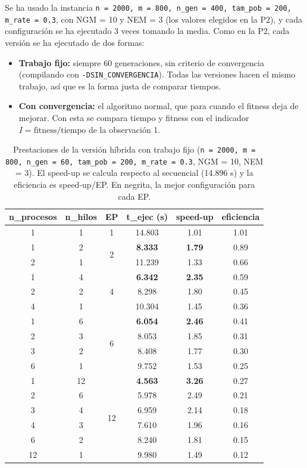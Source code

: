 \documentclass[12pt]{article}
\begin{document}
\begin{enumerate}
Se ha usado la instancia \texttt{n = 2000, m = 800, n\_gen = 400, tam\_pob = 200, m\_rate = 0.3}, con NGM = 10 y NEM = 3 (los valores elegidos en la P2), y cada configuración se ha ejecutado 3 veces tomando la media. Como en la P2, cada versión se ha ejecutado de dos formas:

\begin{itemize}
    \item \textbf{Trabajo fijo:} siempre 60 generaciones, sin criterio de convergencia (compilando con \texttt{-DSIN\_CONVERGENCIA}). Todas las versiones hacen el mismo trabajo, así que es la forma justa de comparar tiempos.
    \item \textbf{Con convergencia:} el algoritmo normal, que para cuando el fitness deja de mejorar. Con esta se compara tiempo y fitness con el indicador $I = \text{fitness}/\text{tiempo}$ de la observación 1.
\end{itemize}

\begin{table}[htbp]
\centering
\begin{tabular}{ccc|ccc}
\toprule
\textbf{n\_procesos} & \textbf{n\_hilos} & \textbf{EP} & \textbf{t\_ejec (s)} & \textbf{speed-up} & \textbf{eficiencia} \\
\midrule
1 & 1 & 1 & 14.803 & 1.01 & 1.01 \\
\midrule
1 & 2 & \multirow{2}{*}{2} & \textbf{8.333} & \textbf{1.79} & 0.89 \\
2 & 1 & & 11.239 & 1.33 & 0.66 \\
\midrule
1 & 4 & \multirow{3}{*}{4} & \textbf{6.342} & \textbf{2.35} & 0.59 \\
2 & 2 & & 8.298 & 1.80 & 0.45 \\
4 & 1 & & 10.304 & 1.45 & 0.36 \\
\midrule
1 & 6 & \multirow{4}{*}{6} & \textbf{6.054} & \textbf{2.46} & 0.41 \\
2 & 3 & & 8.053 & 1.85 & 0.31 \\
3 & 2 & & 8.408 & 1.77 & 0.30 \\
6 & 1 & & 9.752 & 1.53 & 0.25 \\
\midrule
1 & 12 & \multirow{6}{*}{12} & \textbf{4.563} & \textbf{3.26} & 0.27 \\
2 & 6 & & 5.978 & 2.49 & 0.21 \\
3 & 4 & & 6.959 & 2.14 & 0.18 \\
4 & 3 & & 7.610 & 1.96 & 0.16 \\
6 & 2 & & 8.240 & 1.81 & 0.15 \\
12 & 1 & & 9.980 & 1.49 & 0.12 \\
\bottomrule
\end{tabular}
\caption{Prestaciones de la versión híbrida con trabajo fijo (\texttt{n = 2000, m = 800, n\_gen = 60, tam\_pob = 200, m\_rate = 0.3}, NGM = 10, NEM = 3). El speed-up se calcula respecto al secuencial (14.896 s) y la eficiencia es speed-up/EP. En negrita, la mejor configuración para cada EP.}
\label{tab:c2_hibrido}
\end{table}


\end{enumerate}
\end{document}
